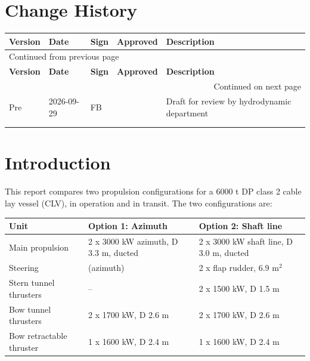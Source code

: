 \documentclass[a4paper,11pt]{article}
\author{Frode Bloch}
\date{\today}
\title{}
\begin{document}
\bvMainTitlePage
\tableofcontents

\section*{Change History}
\label{sec:orga0a310d}
\begin{longtable}{|l|l|l|l|p{8.5cm}|}
\hline
\textbf{Version} & \textbf{Date} & \textbf{Sign} & \textbf{Approved} & \textbf{Description}\\[0pt]
\hline
\endfirsthead
\multicolumn{5}{l}{Continued from previous page} \\[0pt]
\hline

\textbf{Version} & \textbf{Date} & \textbf{Sign} & \textbf{Approved} & \textbf{Description} \\[0pt]

\hline
\endhead
\hline\multicolumn{5}{r}{Continued on next page} \\
\endfoot
\endlastfoot
\hline
Pre & 2026-09-29 & FB &  & Draft for review by hydrodynamic department\\[0pt]
\hline
 &  &  &  & \\[0pt]
\hline
 &  &  &  & \\[0pt]
\hline
\end{longtable}

\newpage

\section{Introduction}
\label{sec:org26d02d9}

This report compares two propulsion configurations for a 6000 t DP class 2 cable lay
vessel (CLV), in operation and in transit.  The two configurations are:

\begin{center}
\begin{tabular}{lll}
\toprule
Unit & Option 1: Azimuth & Option 2: Shaft line\\[0pt]
\midrule
Main propulsion & 2 x 3000 kW azimuth, D 3.3 m, ducted & 2 x 3000 kW shaft line, D 3.0 m, ducted\\[0pt]
Steering & (azimuth) & 2 x flap rudder, 6.9 m\(^2\)\\[0pt]
Stern tunnel thrusters & -- & 2 x 1500 kW, D 1.5 m\\[0pt]
Bow tunnel thrusters & 2 x 1700 kW, D 2.6 m & 2 x 1700 kW, D 2.6 m\\[0pt]
Bow retractable thruster & 1 x 1600 kW, D 2.4 m & 1 x 1600 kW, D 2.4 m\\[0pt]
\bottomrule
\end{tabular}
\end{center}
\end{document}
